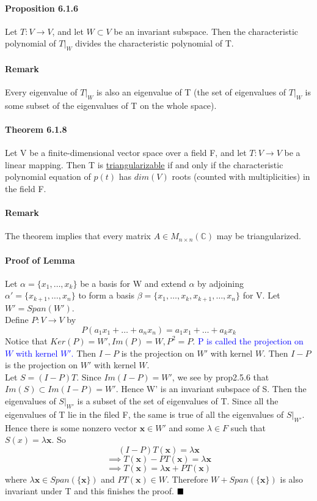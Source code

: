 \documentclass[11pt]{article}
\newcommand{\tb}[1]{\textbf{#1}}
\newcommand{\under}[1]{\underline{#1}}
\newcommand{\qed}[0]{$\hfill\blacksquare$}
\newcommand{\mc}[0]{\mathbb{C}}
\newcommand{\vx}[0]{\tb{x}}
\begin{document}
{\paragraph{Proposition 6.1.6} Let $T: V \rightarrow V$, and let $W \subset V$ be an invariant subspace. Then the characteristic polynomial of $T|_W$ divides the characteristic polynomial of T.
\paragraph{Remark} Every eigenvalue of $T|_W$ is also an eigenvalue of T (the set of eigenvalues of $T|_W$ is some subset of the eigenvalues of T on the whole space).
\paragraph{Theorem 6.1.8} Let V be a finite-dimensional vector space over a field F, and let $T: V \rightarrow V$ be a linear mapping. Then T is \under{triangularizable} if and only if the characteristic polynomial equation of $p(t)$ has $dim(V)$ roots (counted with multiplicities) in the field F.
\paragraph{Remark} The theorem implies that every matrix $A \in M_{n\times n}(\mc)$ may be triangularized.
\paragraph{Proof of Lemma}
Let $\alpha = \{x_1,\hdots,x_k\}$ be a basis for W and extend $\alpha$ by adjoining $\alpha' = \{x_{k+1},\hdots, x_n\}$ to form a basis $\beta = \{x_1,\hdots, x_k, x_{k+1},\hdots, x_n\}$ for V. Let $W' = Span(W')$.\\
Define $P:V\rightarrow V$ by $$P(a_1x_1+\hdots+a_nx_n) = a_1x_1+\hdots+a_kx_k$$
Notice that $Ker(P) = W', Im(P)=W, P^2 = P$. \textcolor{blue}{P is called the projection on $W$ with kernel $W'$.} Then $I - P$ is the projection on $W'$ with kernel $W$.
Then $I-P$ is the projection on $W'$ with kernel $W$.\\
Let $S = (I-P)T$. Since $Im(I-P) = W'$, we see by prop2.5.6 that $Im(S) \subset Im(I-P) = W'$. Hence W' is an invariant subspace of S.
Then the eigenvalues of $S|_{W'}$ is a subset of the set of eigenvalues of T. Since all the eigenvalues of T lie in the filed F, the same is true of all the eigenvalues of $S|_{W'}$. Hence there is some nonzero vector $\vx \in W'$ and some $\lambda \in F$ such that $S(x) = \lambda\vx$. So
$$(I-P)T(\vx) = \lambda\vx$$
$$\implies T(\vx) - PT(\vx) = \lambda \vx$$
$$\implies T(\vx) = \lambda\vx + PT(\vx)$$
where $\lambda\vx \in Span(\{\vx\})$ and $PT(\vx) \in W$. Therefore $W + Span(\{\vx\})$ is also invariant under T and this finishes the proof. \qed
}
\end{document}
